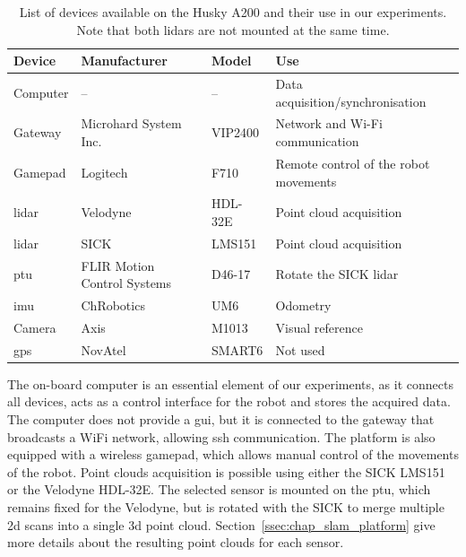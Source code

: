 \begin{table}[H]
    \centering
    \begin{tabular}{@{}llll@{}}
        \toprule
        \textbf{Device} & \textbf{Manufacturer}       & \textbf{Model}  & \textbf{Use}                          \\ \hline
        Computer        & --                          & --              & Data acquisition/synchronisation      \\
        Gateway         & Microhard System Inc.       & VIP2400         & Network and Wi-Fi communication       \\
        Gamepad         & Logitech                    & F710            & Remote control of the robot movements \\
        \gls*{lidar}    & Velodyne                    & HDL-32E         & Point cloud acquisition               \\
        \gls*{lidar}    & SICK                        & LMS151          & Point cloud acquisition               \\
        \gls*{ptu}      & FLIR Motion Control Systems & D46-17          & Rotate the SICK \gls*{lidar}          \\
        \gls*{imu}      & ChRobotics                  & UM6             & Odometry                              \\
        Camera          & Axis                        & M1013           & Visual reference                      \\
        \gls*{gps}      & NovAtel                     & SMART6          & Not used                              \\
        \bottomrule
    \end{tabular}
    \caption{List of devices available on the Husky A200 and their use in our experiments. Note that both \gls*{lidar}s are not mounted at the same time.}
    \label{tab:husky_devices}
\end{table}

The on-board computer is an essential element of our experiments, as it connects all devices, acts as a control interface for the robot and stores the acquired data. The computer does not provide a \gls*{gui}, but it is connected to the gateway that broadcasts a WiFi network, allowing \gls*{ssh} communication. The platform is also equipped with a wireless gamepad, which allows manual control of the movements of the robot. Point clouds acquisition is possible using either the SICK LMS151 or the Velodyne HDL-32E. The selected sensor is mounted on the \gls*{ptu}, which remains fixed for the Velodyne, but is rotated with the SICK to merge multiple \gls*{2d} scans into a single \gls*{3d} point cloud. Section~\ref{ssec:chap_slam_platform} give more details about the resulting point clouds for each sensor.

